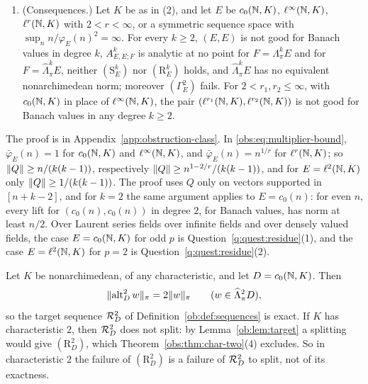 \begin{theorem}
\begin{enumerate}
$\widehat\otimes{}^2_\pi E$ onto $\widehat\Gamma{}^2_\pi E$ has $\norm{R_2}\ge n/\bar\varphi_E(n)^2$. For the
corresponding maps of $c_0(n)$ the bounds are $n-1$, $\lfloor n/2\rfloor$ and $n$.
\item \textup{(Consequences.)} Let $K$ be as in \textup{(2)}, and let $E$ be $c_0(\mathbb N,K)$, $\ell^\infty(\mathbb N,K)$,
$\ell^r(\mathbb N,K)$ with $2<r<\infty$, or a symmetric sequence space with $\sup_nn/\varphi_E(n)^2=\infty$. For every
$k\ge2$, $(E,E)$ is not good for Banach values in degree $k$, $A^k_{E,E;F}$ is analytic at no point for
$F=\Lambda^k_\pi E$ and for $F=\widehat\Lambda^k_\pi E$, neither $(\mathrm S^k_E)$ nor $(\mathrm R^k_E)$ holds, and
$\widehat\Lambda^k_\pi E$ has no equivalent nonarchimedean norm; moreover $(\Gamma^2_E)$ fails. For
$2<r_1,r_2\le\infty$, with $c_0(\mathbb N,K)$ in place of
$\ell^\infty(\mathbb N,K)$, the pair $(\ell^{r_1}(\mathbb N,K),\ell^{r_2}(\mathbb N,K))$ is not good for Banach values in
any degree $k\ge2$.
\end{enumerate}
\end{theorem}

The proof is in Appendix~\ref{app:obstruction-class}. In \eqref{obs:eq:multiplier-bound}, $\bar\varphi_E(n)=1$ for
$c_0(\mathbb N,K)$ and $\ell^\infty(\mathbb N,K)$, and $\bar\varphi_E(n)=n^{1/r}$ for $\ell^r(\mathbb N,K)$; so $\lVert Q\rVert\ge n/(k(k-1))$,
respectively $\lVert Q\rVert\ge n^{1-2/r}/(k(k-1))$, and for $E=\ell^2(\mathbb N,K)$ only $\lVert Q\rVert\ge1/(k(k-1))$. The proof uses
$Q$ only on vectors supported in $[n+k-2]$, and for $k=2$ the same argument applies to $E=c_0(n)$: for even $n$, every
lift for $(c_0(n),c_0(n))$ in degree $2$, for Banach values, has norm at least $n/2$. Over Laurent series fields over
infinite fields and over densely valued fields, the case $E=c_0(\mathbb N,K)$ for odd $p$ is Question~\ref{q:quest:residue}(1),
and the case $E=\ell^2(\mathbb N,K)$ for $p=2$ is Question~\ref{q:quest:residue}(2).

\begin{remark}\label{obs:rem:c0-exact}
Let $K$ be nonarchimedean, of any characteristic, and let $D=c_0(\mathbb N,K)$. Then
\begin{equation}\label{obs:eq:alt-isometry}
 \lVert \operatorname{alt}^2_Dw\rVert_\pi=2\lVert w\rVert_\pi\qquad(w\in\widehat\Lambda^2_\pi D),
\end{equation}
so the target sequence $\mathcal R^2_D$ of Definition~\ref{ob:def:sequences} is exact. If $K$ has characteristic $2$, then
$\mathcal R^2_D$ does not split: by Lemma~\ref{ob:lem:target} a splitting would give $(\mathrm R^2_D)$, which
Theorem~\ref{obs:thm:char-two}(4) excludes. So in characteristic $2$ the failure of $(\mathrm R^2_D)$ is a failure of
$\mathcal R^2_D$ to split, not of its exactness.
\end{remark}

